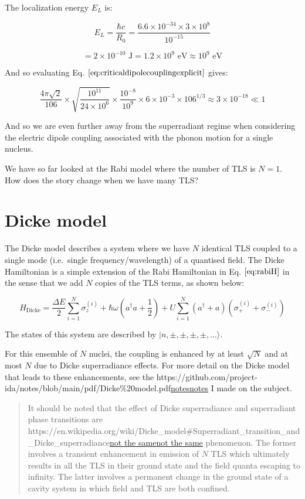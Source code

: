 \documentclass[
]{article}
\let\oldhref\href
\renewcommand{\href}[2]{\ifx#1\urlprefix\oldhref{#1}{#2}\else\uline{\oldhref{#1}{#2}}\fi}
\renewcommand{\[}{\begin{equation}}
\renewcommand{\]}{\end{equation}}
\begin{document}
The localization energy \(E_L\) is:

\[
E_L = \frac{\hbar c}{R_0} = \frac{6.6 \times 10^{-34} \times 3 \times 10^8}{10^{-15}}
\]

\[
= 2 \times 10^{-10} \text{ J} = 1.2 \times 10^9 \text{ eV} \approx 10^9 \text{ eV}
\]

And so evaluating Eq. \(\ref{eq:criticaldipolecouplingexplicit}\) gives:

\[
\frac{4 \pi\sqrt{2} }{106} \times \sqrt{\frac{10^{11}}{24\times10^{6}}} \times \frac{10^{-8}}{10^9} \times 6 \times 10^{-3} \times 106^{1/3} \approx 3\times 10^{-18} \ll 1
\label{eq:dipolewithnumbers}
\]

And so we are even further away from the superradiant regime when
considering the electric dipole coupling associated with the phonon
motion for a single nucleus.

We have so far looked at the Rabi model where the number of TLS is
\(N=1\). How does the story change when we have many TLS?

\section{Dicke model}\label{dicke-model}

The Dicke model describes a system where we have \(N\) identical TLS
coupled to a single mode (i.e.~single frequency/wavelength) of a
quantised field. The Dicke Hamiltonian is a simple extension of the Rabi
Hamiltonian in Eq. \(\ref{eq:rabiH}\) in the sense that we add \(N\)
copies of the TLS terms, as shown below:

\[
H_{\text{Dicke}} = \frac{\Delta E}{2} \sum_{i=1}^N \sigma_z^{(i)} +  \hbar\omega\left(a^{\dagger}a +\frac{1}{2}\right) + U \sum_{i=1}^N (a^\dagger + a) (\sigma_+^{(i)} + \sigma_-^{(i)})
\label{eq:dickeH}
\]

The states of this system are described by
\(|n, \pm, \pm, \pm, \pm, ... \rangle\).

For this ensemble of \(N\) nuclei, the coupling is enhanced by at least
\(\sqrt{N}\) and at most \(N\) due to Dicke superradiance effects. For
more detail on the Dicke model that leads to these enhancements, see the
\href{https://github.com/project-ida/notes/blob/main/pdf/Dicke\%20model.pdf}{notes}
I made on the subject.

\begin{quote}
It should be noted that the effect of Dicke superradiance and
superradiant phase transitions are
\href{https://en.wikipedia.org/wiki/Dicke_model\#Superradiant_transition_and_Dicke_superradiance}{not
the same} phenomenon. The former involves a transient enhancement in
emission of \(N\) TLS which ultimately results in all the TLS in their
ground state and the field quanta escaping to infinity. The latter
involves a permanent change in the ground state of a cavity system in
which field and TLS are both confined.
\end{quote}
\end{document}
